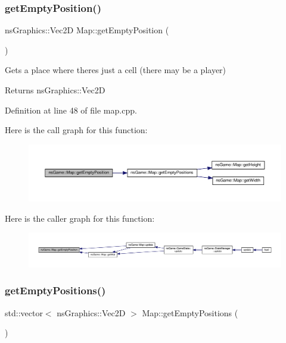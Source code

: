 \subsubsection{\texorpdfstring{get\+Empty\+Position()}{getEmptyPosition()}}
{\footnotesize\ttfamily ns\+Graphics\+::\+Vec2D Map\+::get\+Empty\+Position (\begin{DoxyParamCaption}{ }\end{DoxyParamCaption})}



Gets a place where there\textquotesingle{}s just a cell (there may be a player) 

\begin{DoxyReturn}{Returns}
ns\+Graphics\+::\+Vec2D 
\end{DoxyReturn}


Definition at line 48 of file map.\+cpp.

Here is the call graph for this function\+:\nopagebreak
\begin{figure}[H]
\begin{center}
\leavevmode
\includegraphics[width=350pt]{classns_game_1_1_map_a9c7ae85f01db94d0bedbce4aee4d52f0_cgraph}
\end{center}
\end{figure}
Here is the caller graph for this function\+:\nopagebreak
\begin{figure}[H]
\begin{center}
\leavevmode
\includegraphics[width=350pt]{classns_game_1_1_map_a9c7ae85f01db94d0bedbce4aee4d52f0_icgraph}
\end{center}
\end{figure}
\mbox{\label{classns_game_1_1_map_a098dda0872f84fa83c61693efaca48f1}} 
\subsubsection{\texorpdfstring{get\+Empty\+Positions()}{getEmptyPositions()}}
{\footnotesize\ttfamily std\+::vector$<$ ns\+Graphics\+::\+Vec2D $>$ Map\+::get\+Empty\+Positions (\begin{DoxyParamCaption}{ }\end{DoxyParamCaption})}



